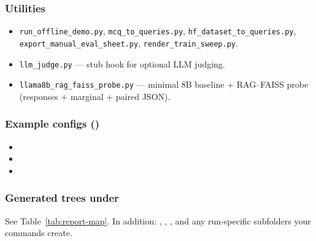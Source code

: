 \documentclass[11pt,a4paper]{article}
\begin{document}
\subsubsection*{Utilities}
\begin{itemize}[leftmargin=1.35em, itemsep=0.35em, parsep=0pt, topsep=2pt]
  \item \texttt{run\_offline\_demo.py}, \texttt{mcq\_to\_queries.py}, \texttt{hf\_dataset\_to\_queries.py}, \texttt{export\_manual\_eval\_sheet.py}, \texttt{render\_train\_sweep.py}.
  \item \texttt{llm\_judge.py} --- stub hook for optional LLM judging.
  \item \texttt{llama8b\_rag\_faiss\_probe.py} --- minimal 8B baseline + RAG--FAISS probe (responses + marginal + paired JSON).
\end{itemize}

\subsubsection*{Example configs ()}
\begin{itemize}[leftmargin=1.35em, itemsep=0.25em, parsep=0pt, topsep=2pt]
  \item {}
  \item {}
  \item {}
\end{itemize}

\subsubsection*{Generated trees under }
\noindent
See Table~\ref{tab:report-map}.
In addition: , , , and any run-specific subfolders your commands create.
\end{document}
